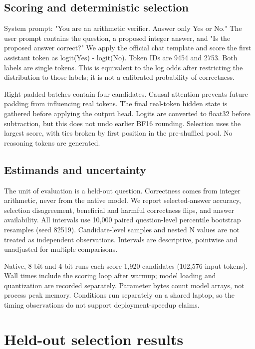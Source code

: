\documentclass[11pt,letterpaper]{article}
\begin{document}
\subsection{Scoring and deterministic selection}

System prompt: "You are an arithmetic verifier. Answer only Yes or No." The user prompt contains the question, a proposed integer answer, and "Is the proposed answer correct?" We apply the official chat template and score the first assistant token as logit(Yes) - logit(No). Token IDs are 9454 and 2753. Both labels are single tokens. This is equivalent to the log odds after restricting the distribution to those labels; it is not a calibrated probability of correctness.


Right-padded batches contain four candidates. Causal attention prevents future padding from influencing real tokens. The final real-token hidden state is gathered before applying the output head. Logits are converted to float32 before subtraction, but this does not undo earlier BF16 rounding. Selection uses the largest score, with ties broken by first position in the pre-shuffled pool. No reasoning tokens are generated.


\subsection{Estimands and uncertainty}

The unit of evaluation is a held-out question. Correctness comes from integer arithmetic, never from the native model. We report selected-answer accuracy, selection disagreement, beneficial and harmful correctness flips, and answer availability. All intervals use 10,000 paired question-level percentile bootstrap resamples (seed 82519). Candidate-level samples and nested N values are not treated as independent observations. Intervals are descriptive, pointwise and unadjusted for multiple comparisons.


Native, 8-bit and 4-bit runs each score 1,920 candidates (102,576 input tokens). Wall times include the scoring loop after warmup; model loading and quantization are recorded separately. Parameter bytes count model arrays, not process peak memory. Conditions run separately on a shared laptop, so the timing observations do not support deployment-speedup claims.


\section{Held-out selection results}
\end{document}
